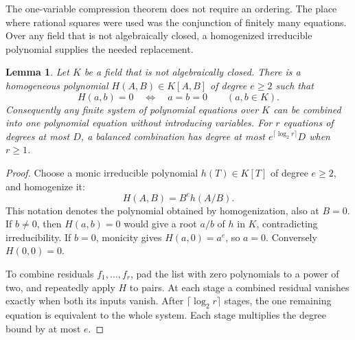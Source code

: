 \documentclass[11pt]{article}
\newtheorem{lemma}[theorem]{Lemma}
\theoremstyle{definition}
\begin{document}
The one-variable compression theorem does not require an ordering. The
place where rational squares were used was the conjunction of finitely
many equations. Over any field that is not algebraically closed, a
homogenized irreducible polynomial supplies the needed replacement.

\begin{lemma}\label{lem:anisotropic-binary-conjunction}
Let $K$ be a field that is not algebraically closed. There is a homogeneous
polynomial $H(A,B)\in K[A,B]$ of degree $e\ge2$ such that
\[
 H(a,b)=0\quad\Longleftrightarrow\quad a=b=0
 \qquad(a,b\in K).
\]
Consequently any finite system of polynomial equations over $K$ can be
combined into one polynomial equation without introducing variables.
For $r$ equations of degrees at most $D$, a balanced combination has
degree at most $e^{\lceil\log_2 r\rceil}D$ when $r\ge1$.
\end{lemma}
\begin{proof}
Choose a monic irreducible polynomial $h(T)\in K[T]$ of degree $e\ge2$,
and homogenize it:
\[
 H(A,B)=B^e h(A/B).
\]
This notation denotes the polynomial obtained by homogenization, also
at $B=0$. If $b\ne0$, then $H(a,b)=0$ would give a root $a/b$ of $h$
in $K$, contradicting irreducibility. If $b=0$, monicity gives
$H(a,0)=a^e$, so $a=0$. Conversely $H(0,0)=0$.

To combine residuals $f_1,\ldots,f_r$, pad the list with zero
polynomials to a power of two, and repeatedly apply $H$ to pairs.
At each stage a combined residual vanishes exactly when both its
inputs vanish. After $\lceil\log_2 r\rceil$ stages, the one remaining
equation is equivalent to the whole system. Each stage multiplies
the degree bound by at most $e$.
\end{proof}
\end{document}
